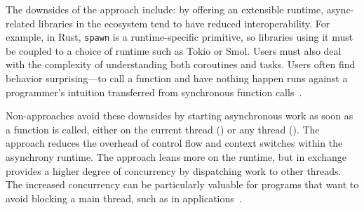 The downsides of the \lazy approach include: by offering an extensible runtime, async-related libraries in the ecosystem tend to have reduced interoperability. For example, in Rust, \lstinline[language=Pseudo]|spawn| is a runtime-specific primitive, so libraries using it must be coupled to a choice of runtime such as Tokio or Smol. Users must also deal with the complexity of understanding both coroutines and tasks. Users often find \lazy behavior surprising---to call a function and have nothing happen runs against a programmer's intuition transferred from synchronous function calls~\cite{d_why_2025,gebra_how_2023,mapeper_starting_2023}.

Non-\lazy approaches avoid these downsides by starting asynchronous work as soon as a function is called, either on the current thread (\eager) or any thread (\seager). The \eager approach reduces the overhead of control flow and context switches within the asynchrony runtime. The \seager approach leans more on the runtime, but in exchange provides a higher degree of concurrency by dispatching work to other threads. The increased concurrency can be particularly valuable for programs that want to avoid blocking a main thread, such as in  applications~\cite{bartlett_why_2023,inc_embracing_nodate,winney_using_2021}.

